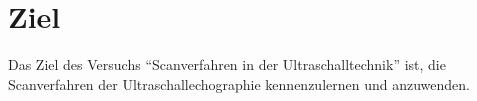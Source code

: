 \section{Ziel}
\label{sec:Ziel}
Das Ziel des Versuchs \enquote{Scanverfahren in der Ultraschalltechnik} ist, die Scanverfahren der Ultraschallechographie kennenzulernen und anzuwenden.